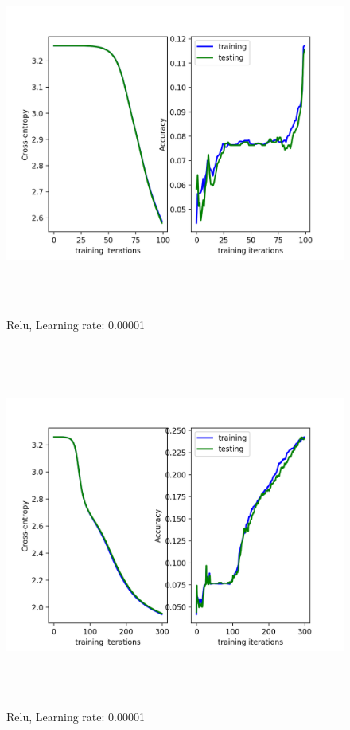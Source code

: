 \documentclass[a4paper]{article}
\begin{document}
\begin{figure}[h]
\caption{Relu, Learning rate: 0.00001}
\centering
\includegraphics[width=15cm, height=12cm]{LR00001.png}
\end{figure}

\begin{figure}[h]
\caption{Relu, Learning rate: 0.00001}
\centering
\includegraphics[width=15cm, height=12cm]{LR00001_2.png}
\end{figure}
\end{document}

